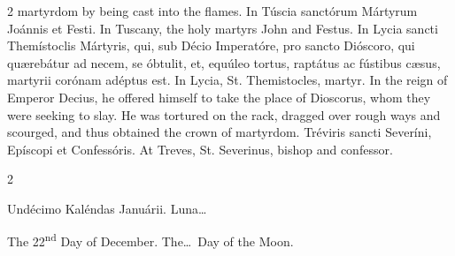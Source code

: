 \begin{paracol}{2}
 martyrdom by being cast into the flames.
\switchcolumn*
{}
In Túscia sanctórum Mártyrum Joánnis et Festi.
\switchcolumn
{}
In Tuscany, the holy martyrs John and Festus.
\switchcolumn*
{}
In Lycia sancti Themístoclis Mártyris, qui, sub 
 Décio Imperatóre, pro sancto Dióscoro, qui quærebátur ad necem, se óbtulit, 
 et, equúleo tortus, raptátus ac fústibus cæsus, martyrii corónam adéptus 
 est.
\switchcolumn
{}
In Lycia, St. Themistocles, martyr. In the reign of Emperor Decius, he 
 offered himself to take the place of Dioscorus, whom they were seeking to 
 slay. He was tortured on the rack, dragged over rough ways and 
 scourged, and thus obtained the crown of martyrdom.
\switchcolumn*
{}
Tréviris sancti Severíni, Epíscopi et 
 Confessóris.
\switchcolumn
{}
At Treves, St. Severinus, bishop and confessor.
\switchcolumn*
{}
\end{paracol}


\begin{paracol}{2}
\begin{center}{\color{gregoriocolor} Undécimo Kaléndas Januárii. 
 Luna\dots\ }\end{center}
\switchcolumn
{}
\begin{center}{\color{gregoriocolor} The 22\textsuperscript{nd} Day of December. The\dots\ Day of the Moon.}\end{center}
\end{paracol}


